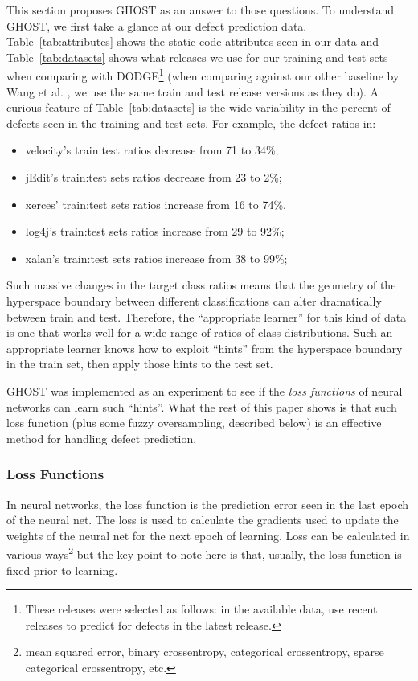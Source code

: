 \documentclass[10pt,compsoc,twocolumn]{IEEEtran}
\newcommand{\bi}{\begin{itemize}}
\newcommand{\ei}{\end{itemize}}
\begin{document}
This section proposes GHOST as an
answer to those questions. To understand
GHOST, we first take a glance at   our defect prediction data. Table~\ref{tab:attributes} shows
the static code attributes seen in our data
and Table~\ref{tab:datasets} shows what releases
we use for our training and test sets when comparing with DODGE\footnote{These releases were selected as follows: in the available data, use recent releases to predict for defects in the latest release.} (when comparing against our other baseline by Wang et al. \cite{wang2018deep}, we use the same train and test release versions as they do). A curious feature of    Table~\ref{tab:datasets} is the wide variability in the percent of defects seen in the training and test sets. For example, the defect ratios in: 
\bi
\item  velocity's  train:test ratios decrease from 71 to 34\%;
\item jEdit's train:test sets ratios decrease from  23 to 2\%;
\item xerces' train:test sets ratios increase from  16 to 74\%.
\item log4j's train:test sets ratios increase from  29 to 92\%;
\item xalan's train:test sets ratios increase from 38 to 99\%;
\ei
Such massive changes in the target class ratios means
that the geometry of the hyperspace boundary
between different classifications  
can alter dramatically between train and test.
Therefore, the ``appropriate
learner''   for
this kind of data is one that
works well for a wide range
of ratios
of class distributions.
Such an appropriate learner
knows how to exploit
``hints'' from the hyperspace boundary in the train
set, then apply those hints to the test set.

GHOST was  implemented as an experiment
to see if the   {\em loss functions} of neural networks can learn such ``hints''.
What the rest of this paper   shows is that
 such loss function
 (plus some
fuzzy oversampling, described below) is an effective
method for handling defect prediction.

\subsubsection{Loss Functions}
\label{sec:loss}
In neural networks, the loss function is the prediction error seen in the last epoch of the
neural net. The loss is used to calculate the gradients used to  update the weights of the neural net for the next epoch of learning. 
Loss can be calculated in various ways\footnote{ 
mean squared error,  
binary crossentropy, 
categorical crossentropy,
sparse categorical crossentropy, etc. } but the key point to note here is that, usually, the loss function is fixed prior to learning.
\end{document}
